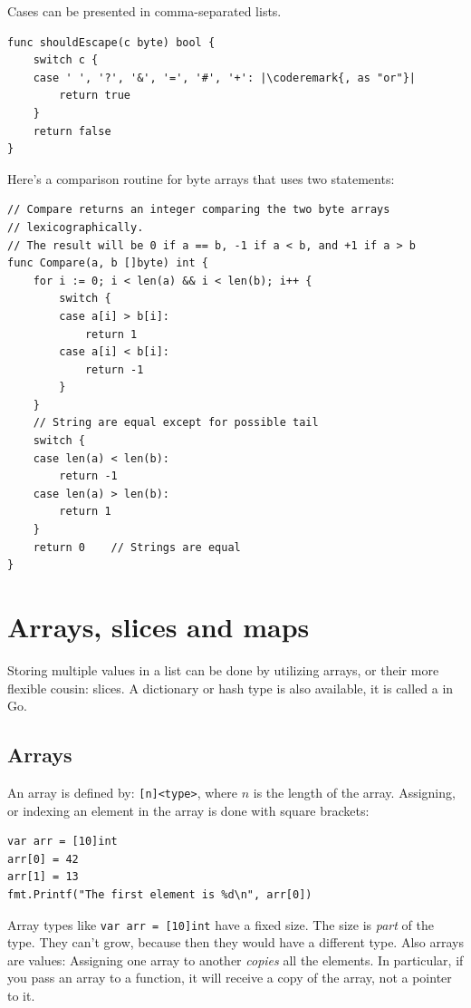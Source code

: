 Cases can be presented in comma-separated lists.
\begin{lstlisting}
func shouldEscape(c byte) bool {
    switch c {
    case ' ', '?', '&', '=', '#', '+': |\coderemark{, as "or"}|
        return true
    }
    return false
}
\end{lstlisting}

Here's a comparison routine for byte arrays that uses two  statements:
\begin{lstlisting}
// Compare returns an integer comparing the two byte arrays
// lexicographically.
// The result will be 0 if a == b, -1 if a < b, and +1 if a > b
func Compare(a, b []byte) int {
    for i := 0; i < len(a) && i < len(b); i++ {
        switch {
        case a[i] > b[i]:
            return 1
        case a[i] < b[i]:
            return -1
        }
    }
    // String are equal except for possible tail
    switch {
    case len(a) < len(b):
        return -1
    case len(a) > len(b):
        return 1
    }
    return 0	// Strings are equal
}
\end{lstlisting}

\section{Arrays, slices and maps}
\label{sec:arrays}
Storing multiple values in a list can be done by utilizing arrays, or
their more flexible cousin: slices. A dictionary or hash type is also
available, it is called a  in Go.

\subsection{Arrays}
An array is defined by: \verb|[n]<type>|, where $n$ is the length
of the array.
Assigning, or indexing an element in the array is done with square
brackets:
\begin{lstlisting}
var arr = [10]int
arr[0] = 42
arr[1] = 13
fmt.Printf("The first element is %d\n", arr[0])
\end{lstlisting}
Array types like \lstinline{var arr = [10]int} have a fixed size. The
size is \emph{part} of the type.
They can't grow, because then they would have a different type. Also arrays
are values: Assigning one array to another \emph{copies} all the elements.
In particular, if you pass an array to a function, it will receive a
copy of the array, not a pointer to it. 

